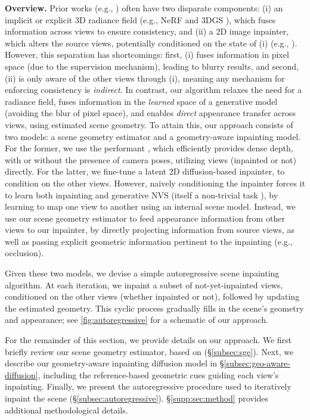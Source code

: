 \noindent\textbf{Overview.}
Prior works (e.g., \cite{spinnerf,reference.guided.nerf,weber2024nerfiller,prabhu2023inpaint3d,mirzaei2024reffusion,chen2024mvip}) often have two disparate components: 
(i) 
an implicit or explicit 3D radiance field (e.g., NeRF \cite{original.nerf} and 3DGS \cite{kerbl3Dgaussians}),
which fuses information across views to ensure consistency, and
(ii) a 2D image inpainter, which alters the source views, potentially conditioned on the state of (i) (e.g., \cite{in2n,wys,weber2024nerfiller}).
However, this separation has shortcomings:
first, (i) fuses information in pixel space (due to the supervision mechanism), leading to blurry results, and second, (ii) is only aware of the other views through (i), meaning
any mechanism for enforcing consistency is \textit{indirect}.
In contrast, our algorithm relaxes the need
for a radiance field,
fuses information in the \textit{learned} space of a generative model (avoiding the blur of pixel space), and enables \textit{direct}
appearance transfer
across views, using estimated scene geometry.
To attain this, our approach consists of two models: 
a scene geometry estimator and a geometry-aware inpainting model.
For the former, we use the performant \duster \cite{dust3r}, which efficiently provides dense depth, with or without the presence of camera poses, utilizing views (inpainted or not) directly.
For the latter, we fine-tune a latent 2D diffusion-based inpainter, to condition on the other views. However, naively conditioning the inpainter forces it to
learn both inpainting and generative NVS
(itself a non-trivial task \cite{yu2024polyoculus,gao2024cat3d,tewari2023diffusion}),
by learning to map one view to another using an internal scene model.
Instead, we use our scene geometry estimator to feed appearance information from other views to our inpainter, by directly projecting information from source views, as well as passing explicit geometric information pertinent to the inpainting (e.g., occlusion). 

Given these two models, we devise a simple autoregressive scene inpainting algorithm.
At each iteration, we inpaint a subset of not-yet-inpainted views, conditioned on the other views (whether inpainted or not), followed by updating the estimated geometry.
This cyclic process gradually fills in the scene's geometry and appearance;
see \cref{fig:autoregressive} for a schematic of our approach.


For the remainder of this section, we provide details on our approach.
We first briefly review our scene geometry estimator, based on \duster \cite{dust3r} (\S\ref{subsec:sge}).
Next, we describe our geometry-aware inpainting diffusion model in \S\ref{subsec:geo-aware-diffusion}, including the reference-based geometric cues guiding each view's inpainting.
Finally, we present the autoregressive procedure used to iteratively inpaint the scene (\S\ref{subsec:autoregressive}). \S\ref{supp:sec:method}
provides additional methodological details.

